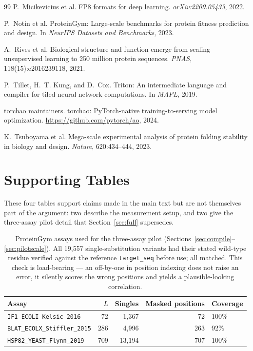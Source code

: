 \documentclass[11pt]{article}
\begin{document}
\begin{thebibliography}{99}
P.~Micikevicius et al.
\newblock FP8 formats for deep learning.
\newblock \emph{arXiv:2209.05433}, 2022.

P.~Notin et al.
\newblock ProteinGym: Large-scale benchmarks for protein fitness prediction and
design.
\newblock In \emph{NeurIPS Datasets and Benchmarks}, 2023.

A.~Rives et al.
\newblock Biological structure and function emerge from scaling unsupervised
learning to 250 million protein sequences.
\newblock \emph{PNAS}, 118(15):e2016239118, 2021.

P.~Tillet, H.~T. Kung, and D.~Cox.
\newblock Triton: An intermediate language and compiler for tiled neural network
computations.
\newblock In \emph{MAPL}, 2019.

torchao maintainers.
\newblock torchao: PyTorch-native training-to-serving model optimization.
\newblock \url{https://github.com/pytorch/ao}, 2024.

K.~Tsuboyama et al.
\newblock Mega-scale experimental analysis of protein folding stability in
biology and design.
\newblock \emph{Nature}, 620:434--444, 2023.

\end{thebibliography}

\appendix
\section{Supporting Tables}
\label{sec:apptables}

These four tables support claims made in the main text but are not themselves
part of the argument: two describe the measurement setup, and two give the
three-assay pilot detail that Section~\ref{sec:full} supersedes.

\begin{table}[htb]
\centering
\caption{ProteinGym assays used for the three-assay pilot
(Sections~\ref{sec:compile}--\ref{sec:pilotscale}). All 19{,}557
single-substitution variants had their stated wild-type residue verified against
the reference \texttt{target\_seq} before use; all matched. This check is
load-bearing --- an off-by-one in position indexing does not raise an error, it
silently scores the wrong positions and yields a plausible-looking correlation.}
\label{tab:pilotassays}
\small
\begin{tabular}{lrrrl}
\toprule
Assay & $L$ & Singles & Masked positions & Coverage \\
\midrule
\texttt{IF1\_ECOLI\_Kelsic\_2016}     &  72 &  1{,}367 &  72 & 100\% \\
\texttt{BLAT\_ECOLX\_Stiffler\_2015}  & 286 &  4{,}996 & 263 &  92\% \\
\texttt{HSP82\_YEAST\_Flynn\_2019}    & 709 & 13{,}194 & 707 & 100\% \\
\bottomrule
\end{tabular}
\end{table}
\end{document}

